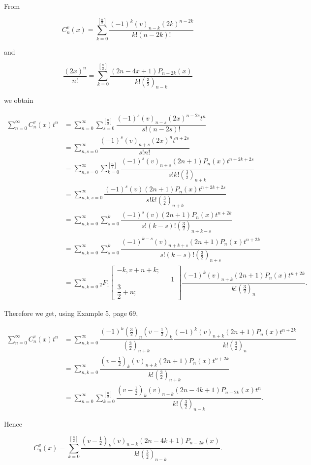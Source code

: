 \begin{solution}
From 

$$C_n^v(x) = \displaystyle\sum_{k=0}^{[\frac{n}{2}]} \dfrac{(-1)^k (v)_{n-k} (2k)^{n-2k}}{k! (n-2k)!}$$

and

$$\dfrac{(2x)^n}{n!} = \displaystyle\sum_{k=0}^{[\frac{n}{2}]} \dfrac{(2n-4x+1) P_{n-2k}(x)}{k! (\frac{3}{2})_{n-k}}$$

we obtain

$$\begin{array}{ll}
\displaystyle\sum_{n=0}^{\infty} C_n^v(x) t^n &= \displaystyle\sum_{n=0}^{\infty} \displaystyle\sum_{s=0}^{[\frac{n}{2}]} \dfrac{(-1)^s (v)_{n-s} (2x)^{n-2s} t^n}{s! (n-2s)!} \\
&= \displaystyle\sum_{n,s=0}^{\infty} \dfrac{(-1)^s (v)_{n+s} (2x)^n t^{n+2s}}{s! n!} \\
&= \displaystyle\sum_{n,s=0}^{\infty} \displaystyle\sum_{k=0}^{[\frac{n}{2}]} \dfrac{(-1)^s (v)_{n+s} (2n+1) P_n(x) t^{n+2k+2s}}{s! k! (\frac{3}{2})_{n+k}} \\
&= \displaystyle\sum_{n,k,s=0}^{\infty} \dfrac{(-1)^s (v) (2n+1) P_n(x) t^{n+2k+2s}}{s! k! (\frac{3}{2})_{n+k}} \\
&= \displaystyle\sum_{n,k=0}^{\infty} \displaystyle\sum_{s=0}^k \dfrac{(-1)^s (v) (2n+1) P_n(x) t^{n+2k}}{s! (k-s)! (\frac{3}{2})_{n+k-s}} \\
&= \displaystyle\sum_{n,k=0}^{\infty} \displaystyle\sum_{s=0}^k \dfrac{(-1)^{k-s} (v)_{n+k+s} (2n+1) P_n(x) t^{n+2k}}{s! (k-s)! (\frac{3}{2})_{n+s}} \\
&= \displaystyle\sum_{n,k=0}^{\infty} {}_2F_1 \left[ \begin{array}{rlr}
-k, v+n+k; & & \\
& & 1 \\
\dfrac{3}{2} + n; & &
\end{array} \right] \dfrac{(-1)^k (v)_{n+k} (2n+1) P_n(x) t^{n+2k}}{k! (\frac{3}{2})_n}.
\end{array}$$

Therefore we get, using Example 5, page 69,

$$\begin{array}{ll}
\displaystyle\sum_{n=0}^{\infty} C_n^v(x) t^n &= \displaystyle\sum_{n,k=0}^{\infty} \dfrac{(-1)^k (\frac{3}{2})_n (v-\frac{1}{2})_k}{(\frac{3}{2})_{n+k}} \dfrac{(-1)^k (v)_{n+k} (2n+1) P_n(x) t^{n+2k}}{k! (\frac{3}{2})_n} \\
&= \displaystyle\sum_{n,k=0}^{\infty} \dfrac{(v-\frac{1}{2})_k (v)_{n+k} (2n+1) P_n(x) t^{n+2k}}{k! (\frac{3}{2})_{n+k}} \\
&=\displaystyle\sum_{n=0}^{\infty} \displaystyle\sum_{k=0}^{[\frac{n}{2}]} \dfrac{(v - \frac{1}{2})_k (v)_{n-k} (2n-4k+1) P_{n-2k}(x) t^n}{k! (\frac{3}{2})_{n-k}}.
\end{array}$$

Hence

$$C_n^v(x) = \displaystyle\sum_{k=0}^{[\frac{n}{2}]} \dfrac{(v-\frac{1}{2})_k (v)_{n-k} (2n-4k+1) P_{n-2k}(x)}{k! (\frac{3}{2})_{n-k}}.$$
\end{solution}